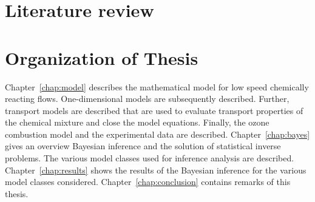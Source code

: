 \section{Literature review}



\section{Organization of Thesis}
\bigskip

Chapter~\ref{chap:model} describes the mathematical model for low speed
chemically reacting flows. One-dimensional models are subsequently described.
Further, transport models are described that are used to evaluate
transport properties of the chemical mixture and close the model equations.
Finally, the ozone combustion model and the experimental data are
described.
Chapter~\ref{chap:bayes} gives an overview
Bayesian inference and the solution of statistical inverse problems.
The various model classes used for inference
analysis are described.
Chapter~\ref{chap:results} shows the results of the Bayesian inference
for the various model classes considered.
Chapter~\ref{chap:conclusion} contains remarks of this thesis.

